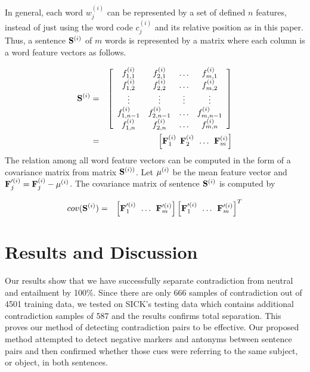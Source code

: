\documentclass[11pt]{article}
\begin{document}
In general, each word $w^{(i)}_{j}$ can be represented by a set of defined $n$ features, instead of just using
the word code $c^{(i)}_{j}$ and its relative position as in this paper. Thus, a sentence ${\bf S}^{(i)}$ of 
$m$ words is represented by a matrix where each column is a word feature vectors as follows.

{\small 
\begin{eqnarray}
{\bf S}^{(i)} & = & \left [
\begin{array}{cccc}
f^{(i)}_{1,1} & f^{(i)}_{2,1} & \ldots & f^{(i)}_{m,1} \\
f^{(i)}_{1,2} & f^{(i)}_{2,2} & \ldots & f^{(i)}_{m,2} \\
\vdots & \vdots & \vdots & \vdots \\
f^{(i)}_{1,n-1} & f^{(i)}_{2,n-1} & \ldots & f^{(i)}_{m,n-1} \\
f^{(i)}_{1,n} & f^{(i)}_{2,n} & \ldots & f^{(i)}_{m,n}
\end{array}
\right ] \\
 & = & \left [{\bf F}^{(i)}_{1} \:\: {\bf F}^{(i)}_{2} \:\: \ldots \:\: {\bf F}^{(i)}_{m} \right ]
\end{eqnarray}
}
The relation among all word feature vectors can be computed in the form of a covariance matrix from
matrix ${\bf S}^{(i))}$. Let ${\bf \mu}^{(i)}$ be the mean feature vector and ${\bf F}^{\prime(i)}_{j} = 
{\bf F}^{(i)}_{j} - {\bf \mu}^{(i)}$. The covariance matrix of sentence ${\bf S}^{(i)}$ is computed by

{\small
\begin{eqnarray}
cov({\bf S}^{(i)}) & = & \left [{\bf F}^{\prime(i)}_{1} \:\: \ldots 
\:\: {\bf F}^{\prime(i)}_{m} \right ] \left [{\bf F}^{\prime(i)}_{1} \:\:
\ldots \:\: {\bf F}^{\prime(i)}_{m} \right ]^{T}
\end{eqnarray}
}

\section{Results and Discussion}

Our results show that we have successfully separate contradiction from neutral and entailment by 100\%. Since there are only 666 samples of contradiction out of 4501 training data, we tested on SICK’s testing data which contains additional contradiction samples of 587 and the results confirms total separation. This proves our method of detecting contradiction pairs to be effective. Our proposed method attempted to detect negative markers and antonyms between sentence pairs and then confirmed whether those cues were referring to the same subject, or object, in both sentences.
\end{document}
